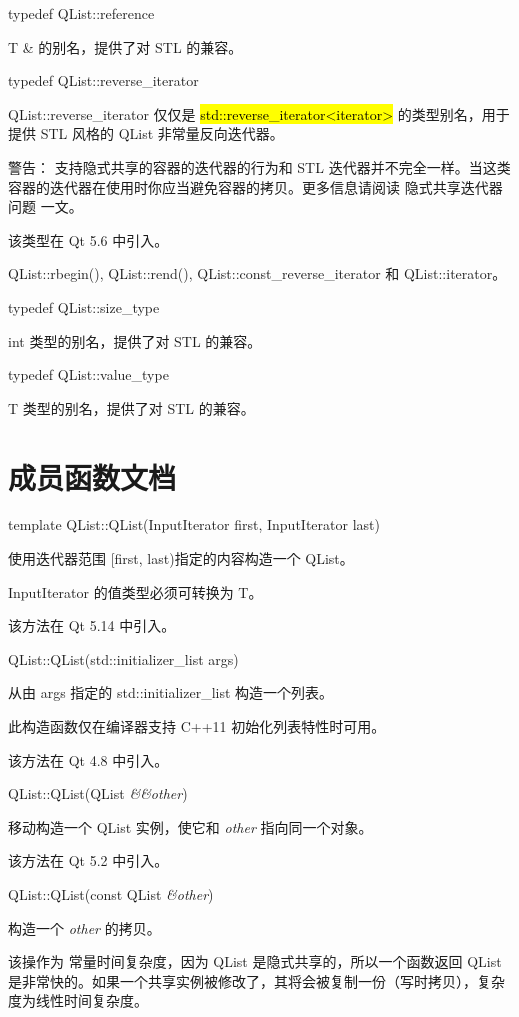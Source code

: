 typedef QList::reference

T \& 的别名，提供了对 STL 的兼容。

typedef QList::reverse\_iterator

QList::reverse\_iterator 仅仅是 \hl{std::reverse\_iterator<iterator>} 的类型别名，用于提供 STL 风格的 QList 非常量反向迭代器。

\begin{notice}
警告： 支持隐式共享的容器的迭代器的行为和 STL 迭代器并不完全一样。当这类容器的迭代器在使用时你应当避免容器的拷贝。更多信息请阅读 隐式共享迭代器问题 一文。
\end{notice}

该类型在 Qt 5.6 中引入。

\begin{seeAlso}
QList::rbegin(), QList::rend(), QList::const\_reverse\_iterator 和 QList::iterator。
\end{seeAlso}

typedef QList::size\_type

int 类型的别名，提供了对 STL 的兼容。

typedef QList::value\_type

T 类型的别名，提供了对 STL 的兼容。

\section{成员函数文档}

template QList::QList(InputIterator first, InputIterator last)

使用迭代器范围 [first, last)指定的内容构造一个 QList。

InputIterator 的值类型必须可转换为 T。

该方法在 Qt 5.14 中引入。

QList::QList(std::initializer\_list args)

从由 args 指定的 std::initializer\_list 构造一个列表。

此构造函数仅在编译器支持 C++11 初始化列表特性时可用。

该方法在 Qt 4.8 中引入。

QList::QList(QList \emph{\&\&other})

移动构造一个 QList 实例，使它和 \emph{other} 指向同一个对象。

该方法在 Qt 5.2 中引入。

QList::QList(const QList \emph{\&other})

构造一个 \emph{other} 的拷贝。

该操作为 常量时间复杂度，因为 QList 是隐式共享的，所以一个函数返回 QList 是非常快的。如果一个共享实例被修改了，其将会被复制一份（写时拷贝），复杂度为线性时间复杂度。

